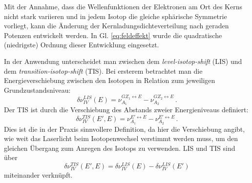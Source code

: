 Mit der Annahme, dass die Wellenfunktionen der Elektronen am Ort des Kerns
nicht stark variieren und in jedem Isotop die gleiche sphärische Symmetrie
vorliegt, kann die Änderung der Kernladungsdichteverteilung nach geraden
Potenzen entwickelt werden. In Gl. \eqref{eq:feldeffekt} wurde
die quadratische (niedrigste) Ordnung dieser Entwicklung eingesetzt.\par
In der Anwendung unterscheidet man zwischen dem \textit{level-isotop-shift}
(LIS) und dem \textit{transition-isotop-shift} (TIS). Bei ersterem betrachtet
man die Energieverschiebung zwischen den Isotopen in Relation zum jeweiligen
Grundzustandsniveau:
\begin{equation}\label{eq:LIS}
	\delta\nu_{IV}^{LIS}(E)=\nu_{A_1}^{GZ_1\leftrightarrow
	E}-\nu_{A_2}^{GZ_2\leftrightarrow E}\,.
\end{equation}
Der TIS ist durch die Verschiebung des Abstands zweier Energieniveaus definiert:
\begin{equation}\label{eq:TIS}
	\delta\nu_{IV}^{TIS}(E',E)=\nu_{A_1}^{E'\leftrightarrow
	E}-\nu_{A_2}^{E'\leftrightarrow E}\,.
\end{equation}
Dies ist die in der Praxis sinnvollere Definition, da hier die Verschiebung
angibt, wie weit das Laserlicht beim Isotopenwechsel verstimmt werden muss, um
den gleichen Übergang zum Anregen des Isotops zu verwenden. LIS und TIS sind
über
\begin{equation}\label{eq:TIS_LIS_verknuepfung}
	\delta\nu_{IV}^{TIS}(E',E)=\delta\nu_{IV}^{LIS}(E)-\delta\nu_{IV}^{LIS}(E')
\end{equation}
miteinander verknüpft.

